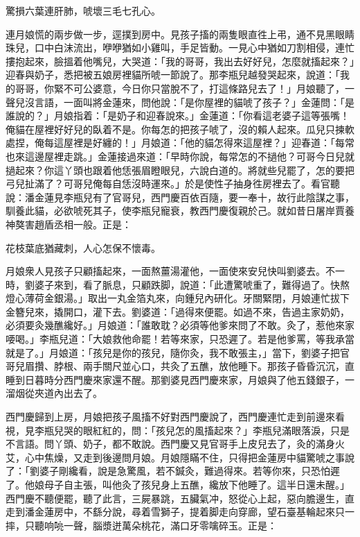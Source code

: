 \begin{myquote} 
驚損六葉連肝肺，唬壞三毛七孔心。
\end{myquote} 

連月娘慌的兩步做一步，逕撲到房中。見孩子搐的兩隻眼直徃上弔，通不見黑眼睛珠兒，口中白沫流出，咿咿猶如小雞叫，手足皆動。一見心中猶如刀割相侵，連忙摟抱起來，臉搵着他嘴兒，大哭道：「我的哥哥，我出去好好兒，怎麼就搐起來？」迎春與奶子，悉把被五娘房裡貓所唬一節說了。那李瓶兒越發哭起來，說道：「我的哥哥，你緊不可公婆意，今日你只當脫不了，打這條路兒去了！」{}月娘聽了，一聲兒沒言語，一面叫將金蓮來，問他說：{}「是你屋裡的貓唬了孩子？」金蓮問：「是誰說的？」月娘指着：「是奶子和迎春說來。」金蓮道：「你看這老婆子這等張嘴！俺貓在屋裡好好兒的臥着不是。你每怎的把孩子唬了，沒的賴人起來。瓜兒只揀軟處捏，俺每這屋裡是好纏的！」月娘道：「他的貓怎得來這屋裡？」迎春道：「每常也來這邊屋裡走跳。」金蓮接過來道：「早時你說，每常怎的不撾他？可哥今日兒就撾起來？你這丫頭也跟着他恁張眉瞪眼兒，六說白道的。將就些兒罷了，怎的要把弓兒扯滿了？可哥兒俺每自恁沒時運來。」{}於是使性子抽身徃房裡去了。看官聽說：潘金蓮見李瓶兒有了官哥兒，西門慶百依百隨，要一奉十，故行此陰謀之事，馴養此貓，必欲唬死其子，使李瓶兒寵衰，教西門慶復親於己。就如昔日屠岸賈養神獒害趙盾丞相一般。{}正是：

\begin{myquote} 
花枝葉底猶藏刺，人心怎保不懷毒。
\end{myquote} 

月娘衆人見孩子只顧搐起來，一面熬薑湯灌他，一面使來安兒快叫劉婆去。不一時，劉婆子來到，看了脈息，只顧跌脚，說道：「此遭驚唬重了，難得過了。快熬燈心薄荷金銀湯。」取出一丸金箔丸來，向鍾兒內研化。牙關緊閉，月娘連忙拔下金簪兒來，撬開口，灌下去。劉婆道：「過得來便罷。如過不來，告過主家奶奶，必須要灸幾醮纔好。」月娘道：「誰敢耽？必須等他爹來問了不敢。灸了，惹他來家喓喝。」李瓶兒道：「大娘救他命罷！若等來家，只恐遲了。若是他爹罵，等我承當就是了。」月娘道：「孩兒是你的孩兒，隨你灸，我不敢張主，」當下，劉婆子把官哥兒眉攢、脖根、兩手關尺並心口，共灸了五醮，放他睡下。那孩子昏昏沉沉，直睡到日暮時分西門慶來家還不醒。那劉婆見西門慶來家，月娘與了他五錢銀子，一溜烟從夾道內出去了。

西門慶歸到上房，月娘把孩子風搐不好對西門慶說了，西門慶連忙走到前邊來看視，見李瓶兒哭的眼紅紅的，問：「孩兒怎的風搐起來？」李瓶兒滿眼落淚，只是不言語。問丫頭、奶子，都不敢說。西門慶又見官哥手上皮兒去了，灸的滿身火艾，心中焦燥，又走到後邊問月娘。月娘隱瞞不住，只得把金蓮房中貓驚唬之事說了：「劉婆子剛纔看，說是急驚風，若不鍼灸，難過得來。若等你來，只恐怕遲了。他娘母子自主張，叫他灸了孩兒身上五醮，纔放下他睡了。這半日還未醒。」西門慶不聽便罷，聽了此言，三屍暴跳，五臟氣冲，怒從心上起，惡向膽邊生，直走到潘金蓮房中，不繇分說，尋着雪獅子，提着脚走向穿廊，望石臺基輪起來只一摔，只聽响喨一聲，腦漿迸萬朵桃花，滿口牙零噙碎玉。正是：


